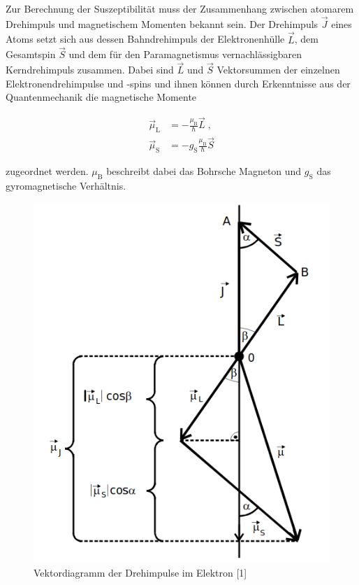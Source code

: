 Zur Berechnung der Suszeptibilität muss der Zusammenhang zwischen atomarem Drehimpuls
und magnetischem Momenten bekannt sein. Der Drehimpuls $\vec{J}$ eines Atoms setzt sich
aus dessen Bahndrehimpuls der Elektronenhülle $\vec{L}$, dem Gesamtspin $\vec{S}$
und dem für den Paramagnetismus vernachlässigbaren Kerndrehimpuls zusammen.
Dabei sind $\vec{L}$ und $\vec{S}$ Vektorsummen der einzelnen Elektronendrehimpulse
und -spins und ihnen können durch Erkenntnisse aus der Quantenmechanik die 
magnetische Momente

\begin{align}
    \vec{\mu}_\text{L} &= - \frac{\mu_\text{B}}{\hbar} \vec{L} \; \text{,} \\
    \vec{\mu}_\text{S} &= - g_\text{S} \frac{\mu_\text{B}}{\hbar} \vec{S}
\end{align}

zugeordnet werden.
$\mu_\text{B}$ beschreibt dabei das Bohrsche Magneton und $g_\text{S}$ das
gyromagnetische Verhältnis.

\begin{figure} [H]
    \centering
    \includegraphics[scale=0.5]{content/bild3.png}
    \caption{Vektordiagramm der Drehimpulse im Elektron [1]}
    \label{fig:plot3}
  \end{figure}

